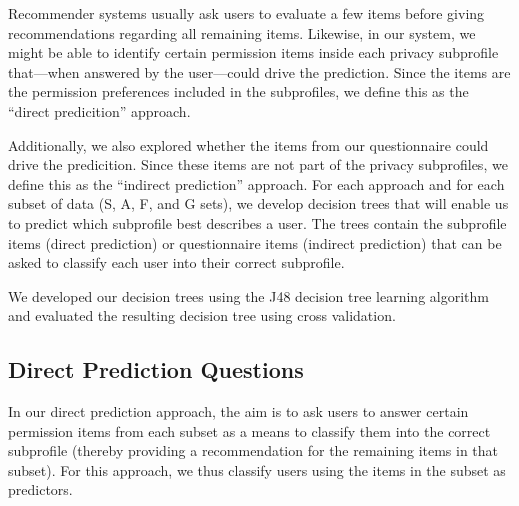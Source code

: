 Recommender systems usually ask users to evaluate a few items before giving recommendations regarding all remaining items. Likewise, in our system, we might be able to identify certain permission items inside each privacy subprofile that---when answered by the user---could drive the prediction. Since the items are the permission preferences included in the subprofiles, we define this as the ``direct predicition'' approach.

Additionally, we also explored whether the items from our questionnaire could drive the predicition. Since these items are not part of the privacy subprofiles, we define this as the ``indirect prediction'' approach. For each approach and for each subset of data (S, A, F, and G sets), we develop decision trees that will enable us to predict which subprofile best describes a user. The trees contain the subprofile items (direct prediction) or questionnaire items (indirect prediction) that can be asked to classify each user into their correct subprofile.

We developed our decision trees using the J48 decision tree learning algorithm and evaluated the resulting decision tree using cross validation.%





\subsection{Direct Prediction Questions}
\label{sec:direct}

In our direct prediction approach, the aim is to ask users to answer certain permission items from each subset as a means to classify them into the correct subprofile (thereby providing a recommendation for the remaining items in that subset). For this approach, we thus classify users using the items in the subset as predictors. 

